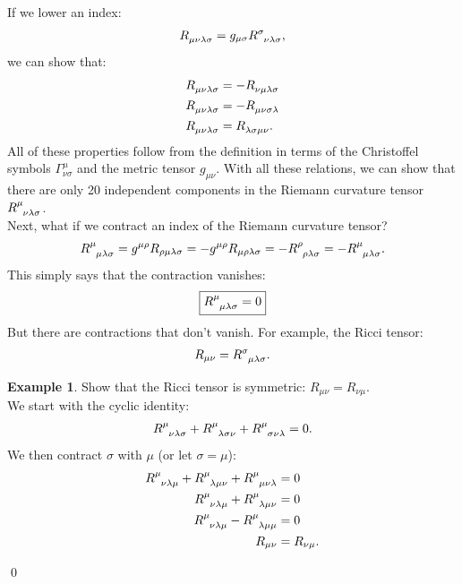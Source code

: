 \documentclass{book}
\theoremstyle{definition}
\newtheorem{exmp}{Example}[section]
\begin{document}
If we lower an index:
\begin{align*}
\tensor{R}{_{\mu\nu\lambda\sigma}} = g_{\mu\sigma}\tensor{R}{^{\sigma}_{\nu\lambda\sigma}},
\end{align*} 
we can show that:
\begin{align*}
\tensor{R}{_{\mu\nu\lambda\sigma}} &= -\tensor{R}{_{\nu\mu\lambda\sigma}}\\
\tensor{R}{_{\mu\nu\lambda\sigma}} &= -\tensor{R}{_{\mu\nu\sigma\lambda}}\\
\tensor{R}{_{\mu\nu\lambda\sigma}} &= \tensor{R}{_{\lambda\sigma\mu\nu}}.
\end{align*}
All of these properties follow from the definition in terms of the Christoffel symbols $\Gamma^{\mu}_{\nu\sigma}$ and the metric tensor $g_{\mu\nu}$. With all these relations, we can show that there are only 20 independent components in the Riemann curvature tensor $\tensor{R}{^{\mu}_{\nu\lambda\sigma}}$.\\

Next, what if we contract an index of the Riemann curvature tensor? 
\begin{align*}
\tensor{R}{^{\mu}_{\mu\lambda\sigma}} = g^{\mu\rho}R_{\rho\mu\lambda\sigma} = -g^{\mu\rho}R_{\mu\rho\lambda\sigma} = -\tensor{R}{^{\rho}_{\rho\lambda\sigma}} = -\tensor{R}{^\mu_{\mu\lambda\sigma}}.
\end{align*}
This simply says that the contraction vanishes:
\begin{align*}
\boxed{\tensor{R}{^{\mu}_{\mu\lambda\sigma}} = 0}
\end{align*}
But there are contractions that don't vanish. For example, the Ricci tensor:
\begin{align*}
R_{\mu\nu} = \tensor{R}{^{\sigma}_{\mu\lambda\sigma}}. 
\end{align*}

\begin{exmp}
	Show that the Ricci tensor is symmetric: $R_{\mu\nu} = R_{\nu\mu}$.\\
	
	We start with the cyclic identity: 
	\begin{align*}
	\tensor{R}{^{\mu}_{\nu\lambda\sigma}} + \tensor{R}{^{\mu}_{\lambda\sigma\nu}} + \tensor{R}{^{\mu}_{\sigma\nu\lambda}} = 0.
	\end{align*}
	We then contract $\sigma$ with $\mu$ (or let $\sigma = \mu$):
	\begin{align*}
	\tensor{R}{^{\mu}_{\nu\lambda\mu}} + \tensor{R}{^{\mu}_{\lambda\mu\nu}} + \tensor{R}{^{\mu}_{\mu\nu\lambda}} &= 0\\
	\tensor{R}{^{\mu}_{\nu\lambda\mu}} + \tensor{R}{^{\mu}_{\lambda\mu\nu}} &= 0\\
	\tensor{R}{^{\mu}_{\nu\lambda\mu}} - \tensor{R}{^{\mu}_{\lambda\mu\mu}} &= 0\\
	R_{\mu\nu} &= R_{\nu\mu}.
	\end{align*}
	
\end{exmp}\qed
\end{document}
